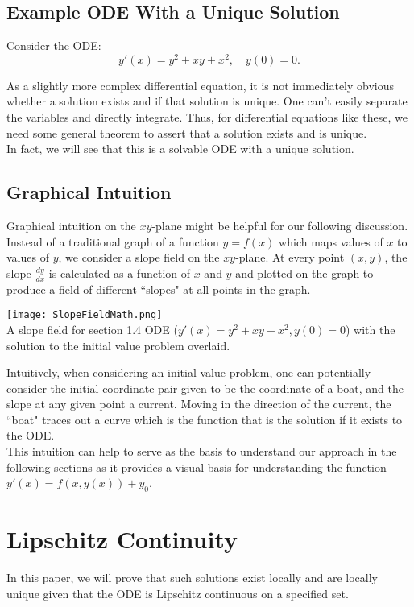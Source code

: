\documentclass{article}
\theoremstyle{remark}
\begin{document}
\subsection{Example ODE With a Unique Solution}
Consider the ODE:
$$y'(x)= y^2 + xy + x^2, \quad y(0) = 0.$$

As a slightly more complex differential equation, it is not immediately obvious whether a solution exists and if that solution is unique. One can't easily separate the variables and directly integrate. Thus, for differential equations like these, we need some general theorem to assert that a solution exists and is unique.\\

In fact, we will see that this is a solvable ODE with a unique solution.


\subsection{Graphical Intuition}
Graphical intuition on the $xy$-plane might be helpful for our following discussion. Instead of a traditional graph of a function $y = f(x)$ which maps values of $x$ to values of $y$, we consider a slope field on the $xy$-plane. At every point $(x,y)$, the slope $\frac{dy}{dx}$ is calculated as a function of $x$ and $y$ and plotted on the graph to produce a field of different ``slopes" at all points in the graph. 

\begin{center}\texttt{[image: SlopeFieldMath.png]} \\ A slope field for section 1.4 ODE ($y'(x)= y^2 + xy + x^2, y(0) = 0$) with the solution to the  initial value problem overlaid. \end{center}


Intuitively, when considering an initial value problem, one can potentially consider the initial coordinate pair given to be the coordinate of a boat, and the slope at any given point a current. Moving in the direction of the current, the ``boat" traces out a curve which is the function that is the solution if it exists to the ODE. \\


This intuition can help to serve as the basis to understand our approach in the following sections as it provides a visual basis for understanding the function $y'(x) = f(x,y(x)) + y_0$.



\section{Lipschitz Continuity}
In this paper, we will prove that such solutions exist locally and are locally unique given that the ODE is Lipschitz continuous on a specified set.
\end{document}
